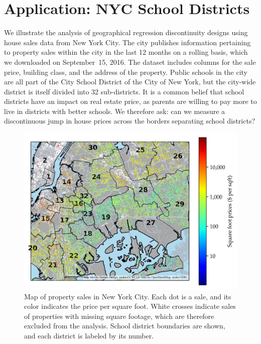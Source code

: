 \documentclass[12pt]{article}
\begin{document}
\section{Application: NYC School Districts}
\label{sec:NYC_example}

We illustrate the analysis of geographical regression discontinuity designs using house sales data from New York City.
The city publishes information pertaining to property sales within the city in the last 12 months on a rolling basis,
which we downloaded on September~15, 2016.
The dataset includes columns for the sale price, building class, and the address of the property.
Public schools in the city are all part of the City School District of the City of New York, but the city-wide district is itself divided into 32 sub-districts.
It is a common belief that school districts have an impact on real estate price, as parents are willing to pay more to live in districts with better schools.
We therefore ask: can we measure a discontinuous jump in house prices across the borders separating school districts?

\begin{figure}[tb]
    \centering
    \includegraphics[width=\textwidth,height=0.5\textheight,keepaspectratio]{../NYC/NYC_plots/NYC_sales_4.png}
    \caption{\label{fig:sales_map}Map of property sales in New York City. Each dot is a sale, and its color indicates the price per square foot. White crosses indicate sales of properties with missing square footage, which are therefore excluded from the analysis. School district boundaries are shown, and each district is labeled by its number.}
\end{figure}
\end{document}
